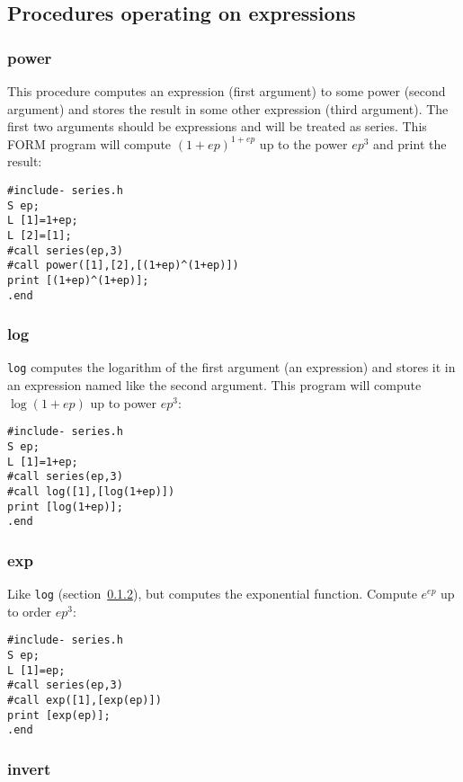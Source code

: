 \documentclass[titlepage]{article}
\begin{document}
\subsection{Procedures operating on expressions}
\label{sec:proc_expr}

\subsubsection{power}
\label{sec:pow}

This procedure computes an expression (first argument) to some power
(second argument) and stores the result in some other expression (third
argument). The first two arguments should be expressions and will be
treated as series. This FORM program will compute $(1+ep)^{1+ep}$ up to
the power $ep^3$ and print the result:
\begin{verbatim}
#include- series.h
S ep;
L [1]=1+ep;
L [2]=[1];
#call series(ep,3)
#call power([1],[2],[(1+ep)^(1+ep)])
print [(1+ep)^(1+ep)];
.end
\end{verbatim}


\subsubsection{log}
\label{sec:log}

{\tt log} computes the logarithm of the first argument (an
expression) and stores it in an expression named like the second
argument. This program will compute $\log (1+ep)$ up to power $ep^3$:
\begin{verbatim}
#include- series.h
S ep;
L [1]=1+ep;
#call series(ep,3)
#call log([1],[log(1+ep)])
print [log(1+ep)];
.end
\end{verbatim}



\subsubsection{exp}
\label{sec:exp}

Like {\tt log} (section~\ref{sec:log}), but computes the
exponential function. Compute $e^{ep}$ up to order $ep^3$:
\begin{verbatim}
#include- series.h
S ep;
L [1]=ep;
#call series(ep,3)
#call exp([1],[exp(ep)])
print [exp(ep)];
.end
\end{verbatim}


\subsubsection{invert}
\label{sec:invert}
\end{document}
